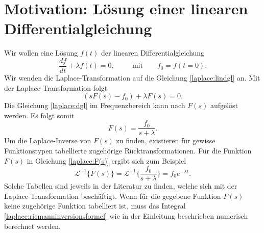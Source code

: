 %
%
%



\section{Motivation: Lösung einer linearen Differentialgleichung
\label{laplace:section:problemstellung}}
Wir wollen eine Lösung $f(t)$ der linearen Differentialgleichung 
\begin{equation}
\frac{df}{dt} + \lambda f(t) = 0, \qquad ~~ \text{mit} \qquad f_{0} = f(t=0).
\label{laplace:lindgl}
\end{equation}
Wir wenden die Laplace-Transformation auf die Gleichung \eqref{laplace:lindgl} an. Mit der Laplace-Transformation folgt
\begin{equation}
(sF(s) - f_{0}) + \lambda F(s) = 0.
\label{laplace:dgl}
\end{equation}
Die Gleichung \eqref{laplace:dgl} im Frequenzbereich kann nach $F(s)$ aufgelöst werden.
Es folgt somit
\begin{equation}
F(s) = \frac{f_{0}}{s + \lambda}.
\label{laplace:F(s)}
\end{equation}
Um die Laplace-Inverse von $F(s)$ zu finden, existieren für gewisse Funktionstypen tabellierte zugehörige Rücktransformationen.
Für die Funktion $F(s)$ in Gleichung \eqref{laplace:F(s)} ergibt sich zum Beispiel
\begin{equation}
\mathcal{L}^{-1}\{F(s)\}=\mathcal{L}^{-1}\{\frac{f_{0}}{s+\lambda}\} = f_{0}e^{-\lambda t}.
\end{equation}
Solche Tabellen sind jeweils in der Literatur zu finden, welche sich mit der Laplace-Transformation beschäftigt.
Wenn für die gegebene Funktion $F(s)$ keine zugehörige Funktion tabelliert ist, muss das Integral \eqref{laplace:riemanninversionsformel} wie in der Einleitung beschrieben numerisch berechnet werden.

